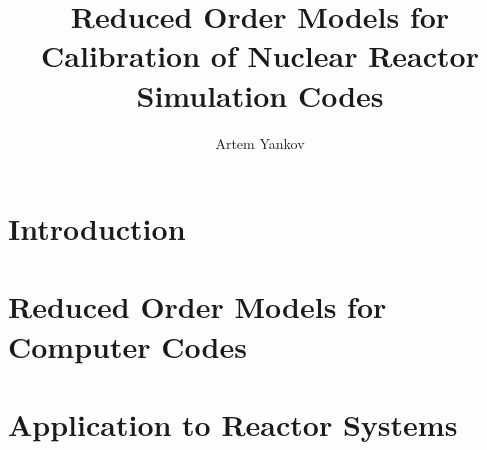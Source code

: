 \documentclass[thesis]{thesis-umich}
\title{Reduced Order Models for Calibration of Nuclear Reactor Simulation Codes}
\author{Artem Yankov}
\begin{document}
\chapter{Introduction}   \label{chap:intro}



\chapter{Reduced Order Models for Computer Codes} \label{chap:rom}


\chapter{Application to Reactor Systems} \label{chap:applications}




\end{document}
